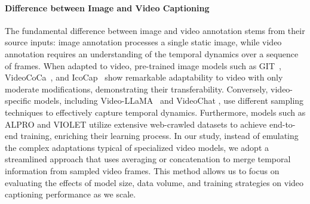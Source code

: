 \paragraph{Difference between Image and Video Captioning}
The fundamental difference between image and video annotation stems from their source inputs: image annotation processes a single static image, while video annotation requires an understanding of the temporal dynamics over a sequence of frames. When adapted to video, pre-trained image models such as GIT~\citep{wang2022git}, VideoCoCa~\citep{yan2022videotext}, and IcoCap~\citep{liang2023icocap} show remarkable adaptability to video with only moderate modifications, demonstrating their transferability. Conversely, video-specific models, including Video-LLaMA~\citep{damonlpsg2023videollama} and VideoChat \citep{2023videochat}, use different sampling techniques to effectively capture temporal dynamics. Furthermore, models such as ALPRO \citep{li2021alignprompt} and VIOLET \citep{fu2023empiricalmvm} utilize extensive web-crawled datasets to achieve end-to-end training, enriching their learning process. In our study, instead of emulating the complex adaptations typical of specialized video models, we adopt a streamlined approach that uses averaging or concatenation to merge temporal information from sampled video frames. This method allows us to focus on evaluating the effects of model size, data volume, and training strategies on video captioning performance as we scale.